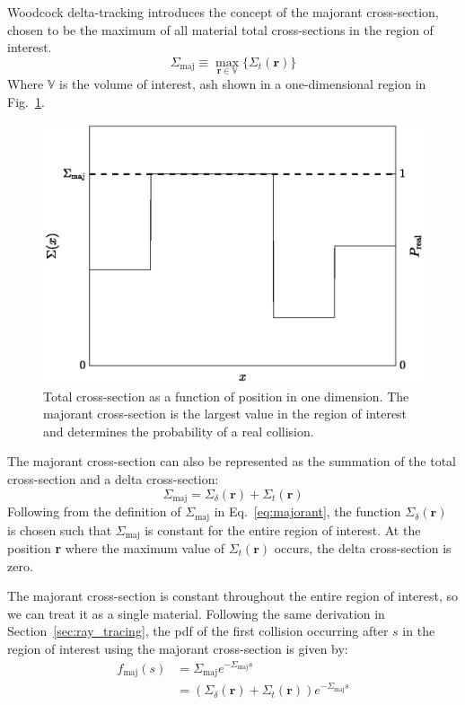 Woodcock delta-tracking introduces the concept of the majorant
cross-section, chosen to be the maximum of all material total
cross-sections in the region of interest.
\begin{equation}
  \label{eq:majorant}
  \Sigma_\mathrm{maj} \equiv \max_{\mathbf{r} \in \mathbb{V}}\{\Sigma_t(\mathbf{r})\}
\end{equation}
Where $\mathbb{V}$ is the volume of interest, ash shown in a
one-dimensional region in Fig.~\ref{fig:sigma_maj}.
\begin{figure}[hbt]
  \centering
  \includegraphics[scale=0.75]{images/sigma_maj}
  \caption{Total cross-section as a function of position in one
    dimension. The majorant cross-section is the largest value in the
    region of interest and determines the probability of a real collision.}
  \label{fig:sigma_maj}
\end{figure}

The majorant
cross-section can also be represented as the summation of the total
cross-section and a delta cross-section:
\begin{equation}
  \label{eq:majorant2}
  \Sigma_\mathrm{maj} = \Sigma_\delta(\mathbf{r}) + \Sigma_t(\mathbf{r})
\end{equation}
Following from the definition of $\Sigma_\mathrm{maj}$ in
Eq.~\eqref{eq:majorant}, the function $\Sigma_\delta(\mathbf{r})$ is
chosen such that $\Sigma_\mathrm{maj}$ is constant for the entire
region of interest. At the position \textbf{r} where the maximum value
of $\Sigma_t(\mathbf{r})$ occurs, the delta cross-section is zero.

The majorant cross-section is constant throughout the entire region of
interest, so we can treat it as a single material. Following the same derivation in
Section~\ref{sec:ray_tracing}, the \gls{pdf} of the first collision occurring after
$s$ in the region of interest using the majorant cross-section is given by:
\begin{align}
  \label{eq:majorantpdf}
  f_\mathrm{maj}(s) &= \Sigma_\mathrm{maj}e^{-\Sigma_\mathrm{maj}s} \\
  & = (\Sigma_\delta(\mathbf{r}) +
    \Sigma_t(\mathbf{r}))e^{-\Sigma_\mathrm{maj}s}
\end{align}


